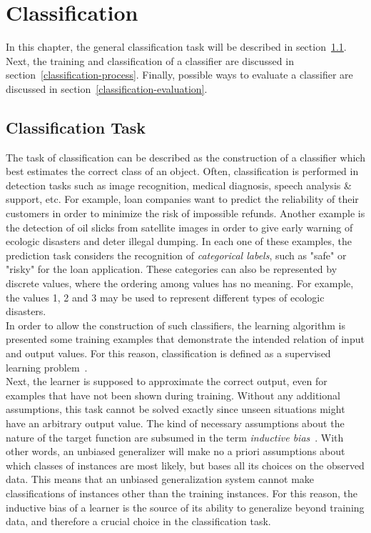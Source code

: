 \chapter{Classification}\label{Classification}
In this chapter, the general classification task will be described in section~\ref{classification-task}. Next, the training and classification of a classifier are discussed in section~\ref{classification-process}. Finally, possible ways to evaluate a classifier are discussed in section~\ref{classification-evaluation}.


\section{Classification Task}\label{classification-task}
The task of classification can be described as the construction of a classifier which best estimates the correct class of an object. Often, classification is performed in detection tasks such as image recognition, medical diagnosis, speech analysis \& support, etc. For example, loan companies want to predict the reliability of their customers in order to minimize the risk of impossible refunds. Another example is the detection of oil slicks from satellite images in order to give early warning of ecologic disasters and deter illegal dumping. In each one of these examples, the prediction task considers the recognition of \textit{categorical labels}, such as "safe" or "risky" for the loan application. These categories can also be represented by discrete values, where the ordering among values has no meaning. For example, the values 1, 2 and 3 may be used to represent different types of ecologic disasters.\\
In order to allow the construction of such classifiers, the learning algorithm is presented some training examples that demonstrate the intended relation of input and output values. For this reason, classification is defined as a supervised learning problem~\cite{bishop}.\\Next, the learner is supposed to approximate the correct output, even for examples that have not been shown during training. Without any additional assumptions, this task cannot be solved exactly since unseen situations might have an arbitrary output value. The kind of necessary assumptions about the nature of the target function are subsumed in the term \textit{inductive bias}~\cite{mitchell80biases}. With other words, an unbiased generalizer will make no a priori assumptions about which classes of instances are most likely, but bases all its choices on the observed data. This means that an unbiased generalization system cannot make classifications of instances other than the training instances. For this reason, the inductive bias of a learner is the source of its ability to generalize beyond training data, and therefore a crucial choice in the classification task.\\
